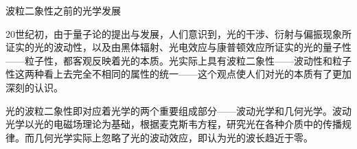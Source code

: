 
\begin{issues}
\issueTODO 波粒二象性之前的光学发展
\end{issues}

20世纪初，由于量子论的提出与发展，人们意识到，光的干涉、衍射与偏振现象所证实的光的波动性，以及由黑体辐射、光电效应与康普顿效应所证实的光的量子性——粒子性，都客观反映着光的本质。光实际上具有波粒二象性——波动性和粒子性这两种看上去完全不相同的属性的统一——这个观点使人们对光的本质有了更加深刻的认识。

光的波粒二象性即对应着光学的两个重要组成部分——波动光学和几何光学。波动光学以光的电磁场理论为基础，根据麦克斯韦方程，研究光在各种介质中的传播规律。而几何光学实际上忽略了光的波动效应，即认为光的波长趋近于零。
